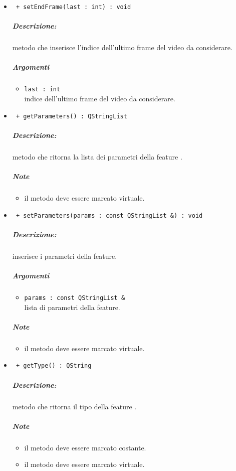 \begin{itemize}
	\item \color{blue}\verb! + setEndFrame(last : int) : void!
		\color{black}
		\subparagraph{Descrizione:} metodo che inserisce l'indice dell'ultimo frame del video da considerare.
		\subparagraph{Argomenti}
			\begin{itemize}
				\item \color{RoyalPurple} \verb!last : int! \\ 
				\color{black} indice dell'ultimo frame del video da considerare.		
			\end{itemize}		
						
	\item \color{blue}\verb! + getParameters() : QStringList!
		\color{black}
		\subparagraph{Descrizione:} metodo che ritorna la lista dei parametri della feature\g{} .
		\subparagraph{Note}
			\begin{itemize}
				\item il metodo deve essere marcato virtuale.
			\end{itemize}
			
	\item \color{blue}\verb! + setParameters(params : const QStringList &) : void!
		\color{black}
		\subparagraph{Descrizione:} inserisce i parametri della feature\g{}.
		\subparagraph{Argomenti}
			\begin{itemize}
				\item \color{RoyalPurple} \verb!params : const QStringList & ! \\ 
				\color{black} lista di parametri della feature.		
			\end{itemize}
		\subparagraph{Note}
			\begin{itemize}
				\item il metodo deve essere marcato virtuale.
			\end{itemize}
			
	\item \color{blue}\verb! + getType() : QString!
		\color{black}
		\subparagraph{Descrizione:} metodo che ritorna il tipo della feature\g{} .
		\subparagraph{Note}
			\begin{itemize}
				\item il metodo deve essere marcato costante.
				\item il metodo deve essere marcato virtuale.
			\end{itemize}
		
	\end{itemize}


\color{black}
\pagebreak
